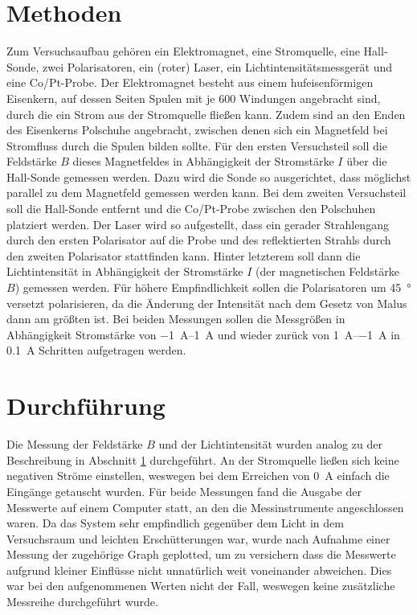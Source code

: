 \section{Methoden} \label{sec:Methoden}
			
	Zum Versuchsaufbau gehören ein Elektromagnet, eine Stromquelle, eine Hall-Sonde, zwei Polarisatoren, ein (roter) Laser, ein Lichtintensitätsmessgerät und eine Co/Pt-Probe.
	Der Elektromagnet besteht aus einem hufeisenförmigen Eisenkern, auf dessen Seiten Spulen mit je 600 Windungen angebracht sind, durch die ein Strom aus der Stromquelle fließen kann. 
	Zudem sind an den Enden des Eisenkerns Polschuhe angebracht, zwischen denen sich ein Magnetfeld bei Stromfluss durch die Spulen bilden sollte.
	Für den ersten Versuchsteil soll die Feldstärke $B$ dieses Magnetfeldes in Abhängigkeit der Stromstärke $I$ über die Hall-Sonde gemessen werden.
	Dazu wird die Sonde so ausgerichtet, dass möglichst parallel zu dem Magnetfeld gemessen werden kann.
	Bei dem zweiten Versuchsteil soll die Hall-Sonde entfernt und die Co/Pt-Probe zwischen den Polschuhen platziert werden.
	Der Laser wird so aufgestellt, dass ein gerader Strahlengang durch den ersten Polarisator auf die Probe und des reflektierten Strahls durch den zweiten Polarisator stattfinden kann.
	Hinter letzterem soll dann die Lichtintensität in Abhängigkeit der Stromstärke $I$ (der magnetischen Feldstärke $B$) gemessen werden.
	Für höhere Empfindlichkeit sollen die Polarisatoren um \SI{45}{\degree} versetzt polarisieren, da die Änderung der Intensität nach dem Gesetz von Malus dann am größten ist.
	Bei beiden Messungen sollen die Messgrößen in Abhängigkeit Stromstärke von \SIrange{-1}{1}{\ampere}	und wieder zurück von \SIrange{1}{-1}{\ampere} in \SI{0,1}{\ampere} Schritten aufgetragen werden.
	
\section{Durchführung}
		
	Die Messung der Feldstärke $B$ und der Lichtintensität wurden analog zu der Beschreibung in Abschnitt \ref{sec:Methoden} durchgeführt.
	An der Stromquelle ließen sich keine negativen Ströme einstellen, weswegen bei dem Erreichen von \SI{0}{\ampere} einfach die Eingänge getauscht wurden.
	Für beide Messungen fand die Ausgabe der Messwerte auf einem Computer statt, an den die Messinstrumente angeschlossen waren.
	Da das System sehr empfindlich gegenüber dem Licht in dem Versuchsraum und leichten Erschütterungen war, wurde nach Aufnahme einer Messung der zugehörige Graph geplotted, um zu versichern dass die Messwerte aufgrund kleiner Einflüsse nicht unnatürlich weit voneinander abweichen.
	Dies war bei den aufgenommenen Werten nicht der Fall, weswegen keine zusätzliche Messreihe durchgeführt wurde. 
		
